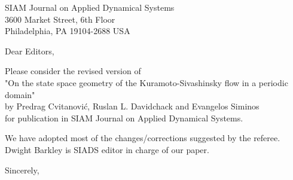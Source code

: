 \documentclass[11pt]{letter}
\date{Octomber 4, 2009}
\begin{document}
\begin{letter}{
SIAM Journal on Applied Dynamical Systems\\
3600 Market Street, 6th Floor\\
Philadelphia, PA 19104-2688 USA
}


\opening{Dear Editors,}

Please consider the revised version of
\\
"On the state space geometry of the
Kuramoto-Sivashinsky flow in a periodic domain"
\\
by Predrag Cvitanovi\'c, Ruslan L. Davidchack and Evangelos Siminos
\\
for publication in SIAM Journal on
Applied Dynamical Systems.

We have adopted most of the changes/corrections suggested by the referee.
\\
Dwight Barkley is SIADS editor in charge of our paper.

\closing{Sincerely,}


\end{letter}
\end{document}
